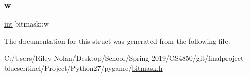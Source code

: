 \mbox{\label{structbitmask_a03e8844824a2221488952b5d8cb36fbc}} 
\subsubsection{\texorpdfstring{w}{w}}
{\footnotesize\ttfamily \mbox{\hyperlink{warnings_8h_a74f207b5aa4ba51c3a2ad59b219a423b}{int}} bitmask\+::w}



The documentation for this struct was generated from the following file\+:\begin{DoxyCompactItemize}
\item 
C\+:/\+Users/\+Riley Nolan/\+Desktop/\+School/\+Spring 2019/\+C\+S4850/git/finalproject-\/bluesentinel/\+Project/\+Python27/pygame/\mbox{\hyperlink{bitmask_8h}{bitmask.\+h}}\end{DoxyCompactItemize}

